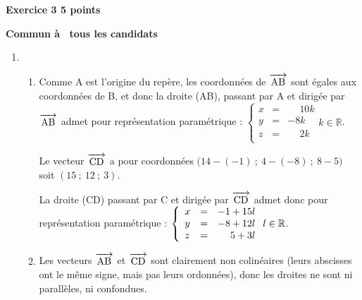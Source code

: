 \documentclass[10pt]{article}
\newcommand{\vect}[1]{\overrightarrow{\,\mathstrut#1\,}}
\newcommand{\R}{\mathbb{R}}
\begin{document}
\vspace{0,5cm}
	
\textbf{Exercice 3 \hfill  5 points}
	
\textbf{Commun à  tous les candidats}
	
\medskip

	\begin{enumerate}
		\item \begin{enumerate}
			\item Comme A est l'origine du repère, les coordonnées de $\vect{\text{AB}}$ sont égales aux coordonnées de B, et donc la droite (AB), passant par A et dirigée par $\vect{\text{AB}}$ admet pour représentation paramétrique : $\left\{\begin{array}{lcr} x &= &\phantom{-}10k \\ y& = &-8k \\ z& =& \phantom{-}2k\\
\end{array}\right.  k \in \R$.
	
\smallskip
	
Le vecteur $ \vect{\text{CD}} $ a pour coordonnées $\big(14 - (-1)~;~4 - (-8)~;~8 - 5\big)$ soit $(15~;~12~;~3)$.
			
La droite (CD) passant par C et dirigée par $\vect{\text{CD}}$ admet donc pour représentation paramétrique : $\left\{\begin{array}{lc r} x &=& -1 + 15l \\ y &=& -8 + 12l \\ z &=& 5 + 3l\\
\end{array}\right.  l \in \R$.
			
			\item Les vecteurs $ \vect{\text{AB}} $ et $\vect{\text{CD}}$ sont clairement non colinéaires (leurs abscisses ont le même signe, mais pas leurs ordonnées), donc les droites ne sont ni parallèles, ni confondues.
			

\end{enumerate}
\end{enumerate}
\end{document}
